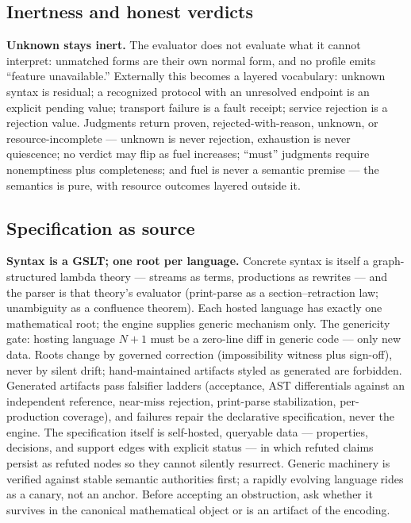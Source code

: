\documentclass[11pt]{article}
\begin{document}
\subsection{Inertness and honest verdicts}
\textbf{Unknown stays inert.}  The evaluator does not evaluate what it
cannot interpret: unmatched forms are their own normal form, and no
profile emits ``feature unavailable.''  Externally this becomes a layered
vocabulary: unknown syntax is residual; a recognized protocol with an
unresolved endpoint is an explicit pending value; transport failure is a
fault receipt; service rejection is a rejection value.  Judgments return
proven, rejected-with-reason, unknown, or resource-incomplete ---
unknown is never rejection, exhaustion is never quiescence; no verdict
may flip as fuel increases; ``must'' judgments require nonemptiness plus
completeness; and fuel is never a semantic premise --- the semantics is
pure, with resource outcomes layered outside it.

\subsection{Specification as source}
\textbf{Syntax is a GSLT; one root per language.}  Concrete syntax is
itself a graph-structured lambda theory --- streams as terms, productions
as rewrites --- and the parser is that theory's evaluator (print-parse as
a section--retraction law; unambiguity as a confluence theorem).  Each
hosted language has exactly one mathematical root; the engine supplies
generic mechanism only.  The genericity gate: hosting language $N{+}1$
must be a zero-line diff in generic code --- only new data.  Roots change
by governed correction (impossibility witness plus sign-off), never by
silent drift; hand-maintained artifacts styled as generated are forbidden.
Generated artifacts pass falsifier ladders (acceptance, AST differentials
against an independent reference, near-miss rejection, print-parse
stabilization, per-production coverage), and failures repair the
declarative specification, never the engine.  The specification itself is
self-hosted, queryable data --- properties, decisions, and support edges
with explicit status --- in which refuted claims persist as refuted nodes
so they cannot silently resurrect.  Generic machinery is verified against
stable semantic authorities first; a rapidly evolving language rides as a
canary, not an anchor.  Before accepting an obstruction, ask whether it
survives in the canonical mathematical object or is an artifact of the
encoding.
\end{document}

